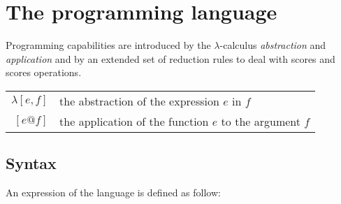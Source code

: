 \documentclass[10pt,a4paper,frenchb]{article}
\makeatletter
\newcommand{\applyop}	{\ensuremath{@}}
\makeatother
\begin{document}
\section{The programming language}

Programming capabilities are introduced by the $\lambda$-calculus \emph{abstraction} and \emph{application} and by an extended set of reduction rules to deal with scores and scores operations.

\begin{center}
\begin{tabular}{rl}
\hline
$\lambda [e,f]$ & the abstraction of the expression $e$ in $f$ \\
$[e \applyop f]$ & the application of the function $e$ to the argument $f$\\
\hline
\end{tabular}
\end{center}

\subsection{Syntax}

An expression of the language is defined as follow:
\end{document}

